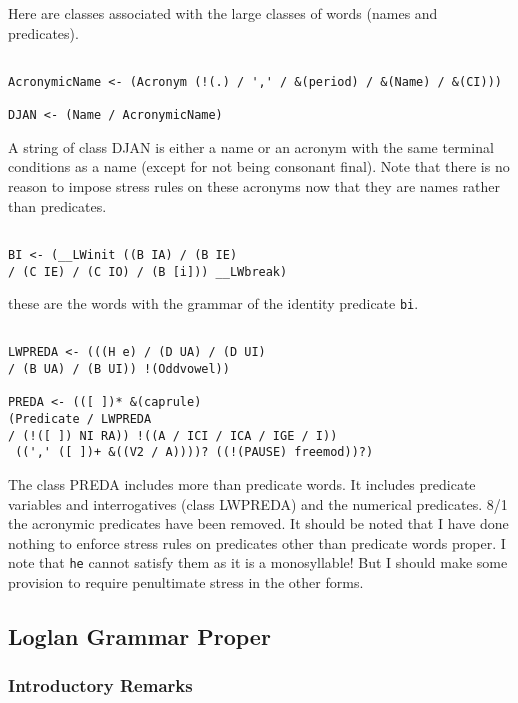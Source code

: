 \documentclass[12pt]{article}
\begin{document}
Here are classes associated with the large classes of words (names and predicates).

\begin{verbatim}

AcronymicName <- (Acronym (!(.) / ',' / &(period) / &(Name) / &(CI)))

DJAN <- (Name / AcronymicName)

\end{verbatim}

A string of class DJAN is either a name or an acronym with the same terminal conditions as a name (except for not being consonant final).
Note that there is no reason to impose stress rules on these acronyms now that they are names rather than predicates.

\begin{verbatim}

BI <- (__LWinit ((B IA) / (B IE) 
/ (C IE) / (C IO) / (B [i])) __LWbreak)

\end{verbatim}

these are the words with the grammar of the identity predicate {\tt bi}.

\begin{verbatim}

LWPREDA <- (((H e) / (D UA) / (D UI) 
/ (B UA) / (B UI)) !(Oddvowel))

PREDA <- (([ ])* &(caprule) 
(Predicate / LWPREDA
/ (!([ ]) NI RA)) !((A / ICI / ICA / IGE / I))
 ((',' ([ ])+ &((V2 / A))))? ((!(PAUSE) freemod))?)

\end{verbatim}

The class PREDA includes more than predicate words.  It includes predicate variables and interrogatives
(class LWPREDA)  and the numerical predicates.  8/1 the acronymic predicates have been removed.   It should be noted that I have done nothing
to enforce stress rules on predicates other than predicate words proper.  I note that {\tt he} cannot satisfy them as it
is a monosyllable!  But I should make some provision to require penultimate stress in the other forms.



\subsection{Loglan Grammar Proper}

\subsubsection{Introductory Remarks}
\end{document}
